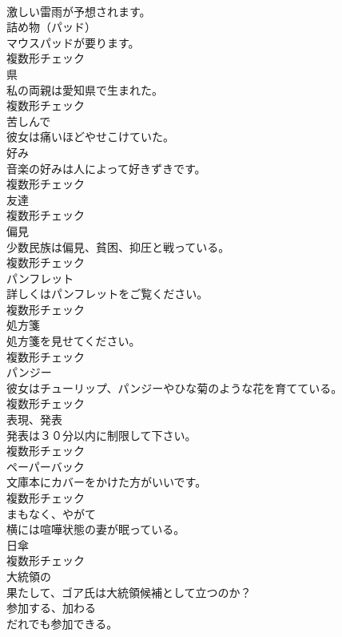 \documentclass[8pt]{extreport}
\begin{document}
\begin{CJK}{UTF8}{min}
\\	激しい雷雨が予想されます。	
\\	[名詞]	詰め物（パッド）	
\\	マウスパッドが要ります。	
\\	複数形チェック
\\	[名詞]	県	
\\	私の両親は愛知県で生まれた。	
\\	複数形チェック
\\	[副詞]	苦しんで	
\\	彼女は痛いほどやせこけていた。	
\\	[名詞]	好み	
\\	音楽の好みは人によって好きずきです。	
\\	複数形チェック
\\	[名詞]	友達	
\\	複数形チェック
\\	[名詞]	偏見	
\\	少数民族は偏見、貧困、抑圧と戦っている。	
\\	複数形チェック
\\	[名詞]	パンフレット	
\\	詳しくはパンフレットをご覧ください。	
\\	複数形チェック
\\	[名詞]	処方箋	
\\	処方箋を見せてください。	
\\	複数形チェック
\\	[名詞]	パンジー	
\\	彼女はチューリップ、パンジーやひな菊のような花を育てている。	
\\	複数形チェック
\\	[名詞]	表現、発表	
\\	発表は３０分以内に制限して下さい。	
\\	複数形チェック
\\	[名詞]	ペーパーバック	
\\	文庫本にカバーをかけた方がいいです。	
\\	複数形チェック
\\	[副詞]	まもなく、やがて	
\\	横には喧嘩状態の妻が眠っている。	
\\	[名詞]	日傘	
\\	複数形チェック
\\	[形容詞]	大統領の	
\\	果たして、ゴア氏は大統領候補として立つのか？	
\\	[動詞]	参加する、加わる	
\\	だれでも参加できる。	

\end{CJK}
\end{document}
